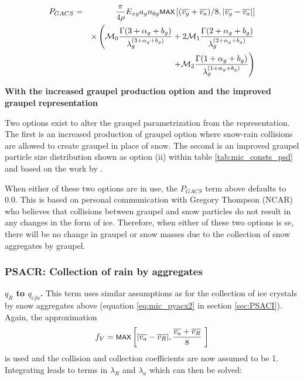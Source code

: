 \documentclass{UMDP_article}
\newcommand{\mmax}[1] {\mbox{\footnotesize \sf MAX} \left[#1\right]  }
\def\bq{\begin{equation}}
\def\eq{\end{equation}}
\begin{document}
\begin{eqnarray}
P_{GACS}  &=&\frac{\pi}{4\rho}E_{xy}a_gn_{0g}
                                  \mmax{(\overline{v_g}+\overline{v_a})/8,| 
\overline{v_g} -\overline{v_a} |}
          \nonumber \\
           & &\times
           \left(\mathcal{M}_0
                 \frac{\Gamma(3+\alpha_g+b_g)}{\lambda_g^{(3+\alpha_g+b_g)}}
               +2\mathcal{M}_1
                 \frac{\Gamma(2+\alpha_g+b_g)}{\lambda_g^{(2+\alpha_g+b_g)}}
 \right. \nonumber \\ & & \left. \hspace{1.5cm}
                +\mathcal{M}_2
                 \frac{\Gamma(1+\alpha_g+b_g)}{\lambda_g^{(1+\alpha_g+b_g)}}
                                                           \right)
\label{eq:pgacs_psd}
\end{eqnarray}

\textbf{With the increased graupel production option and the improved graupel 
representation}

Two options exist to alter the graupel parametrization from the 
\cite{Forbes:Halliwell:2003} representation. The first is an increased
production of graupel option where snow-rain collisions are allowed to
create graupel in place of snow. The second is an improved graupel
particle size distribution shown as option (ii) within table
\ref{tab:mic_consts_psd} and based on the work by \cite{Field:etal:2019}. 

When either of these two options are in use, the $P_{GACS}$ term above 
defaults to 0.0. This is based on personal communication with Gregory Thompson 
(NCAR) who believes that collisions between graupel and snow particles do not 
result in any changes in the form of ice. Therefore, when either of these
two options is se, there will be no change in graupel or snow masses due
to the collection of snow aggregates by graupel.

\subsubsection{PSACR:  Collection of rain by aggregates}
\label{sec:PSACR}

\textbf{$q_{R}$ to $q_{cfa}$.}
This term uses similar assumptions as for the collection of ice crystals by 
snow aggregates above (equation \ref{eq:mic_pyacx2} in section \ref{sec:PSACI}). 
Again, the approximation
\bq
f_V = \mmax{| \overline{v_a} - \overline{v_R} |,  \frac{ \overline{v_a} + 
\overline{v_R} }{8}~}
\eq
is used and the collision and collection coefficients are now assumed to be 1.
Integrating leads to terms in $\lambda_R$ and $\lambda_a$ which can then be 
solved:
\end{document}
